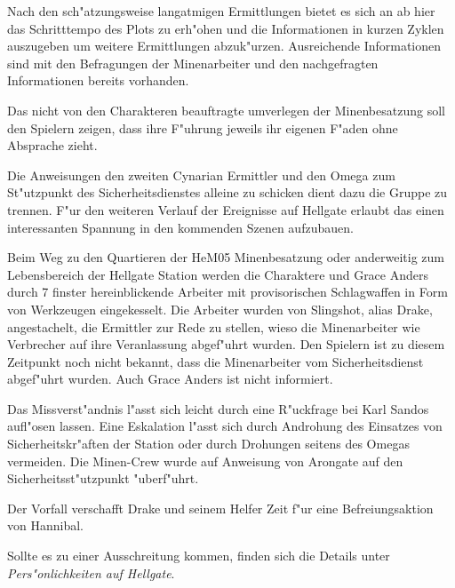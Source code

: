 \begin{remarks}
	Nach den sch"atzungsweise langatmigen Ermittlungen bietet es sich an ab hier das Schritttempo des Plots zu erh"ohen und die Informationen in kurzen Zyklen auszugeben um weitere Ermittlungen abzuk"urzen. Ausreichende Informationen sind mit den Befragungen der Minenarbeiter und den nachgefragten Informationen bereits vorhanden.

	Das nicht von den Charakteren beauftragte umverlegen der Minenbesatzung soll den Spielern zeigen, dass ihre F"uhrung jeweils ihr eigenen F"aden ohne Absprache zieht.

	Die Anweisungen den zweiten Cynarian Ermittler und den Omega zum St"utzpunkt des Sicherheitsdienstes alleine zu schicken dient dazu die Gruppe zu trennen. F"ur den weiteren Verlauf der Ereignisse auf Hellgate erlaubt das einen interessanten Spannung in den kommenden Szenen aufzubauen.
\end{remarks}


Beim Weg zu den Quartieren der HeM05 Minenbesatzung oder anderweitig zum Lebensbereich der Hellgate Station werden die Charaktere und Grace Anders durch 7 finster hereinblickende Arbeiter mit provisorischen Schlagwaffen in Form von Werkzeugen eingekesselt. Die Arbeiter wurden von Slingshot, alias Drake, angestachelt, die Ermittler zur Rede zu stellen, wieso die Minenarbeiter wie Verbrecher auf ihre Veranlassung abgef"uhrt wurden. Den Spielern ist zu diesem Zeitpunkt noch nicht bekannt, dass die Minenarbeiter vom Sicherheitsdienst abgef"uhrt wurden. Auch Grace Anders ist nicht informiert.

\begin{remarks}
	Das Missverst"andnis l"asst sich leicht durch eine R"uckfrage bei Karl Sandos aufl"osen lassen. Eine Eskalation l"asst sich durch Androhung des Einsatzes von Sicherheitskr"aften der Station oder durch Drohungen seitens des Omegas vermeiden. Die Minen-Crew wurde auf Anweisung von Arongate auf den Sicherheitsst"utzpunkt "uberf"uhrt.

	Der Vorfall verschafft Drake und seinem Helfer Zeit f"ur eine Befreiungsaktion von Hannibal.
	
	Sollte es zu einer Ausschreitung kommen, finden sich die Details unter \emph{Pers"onlichkeiten auf Hellgate}.
\end{remarks}


